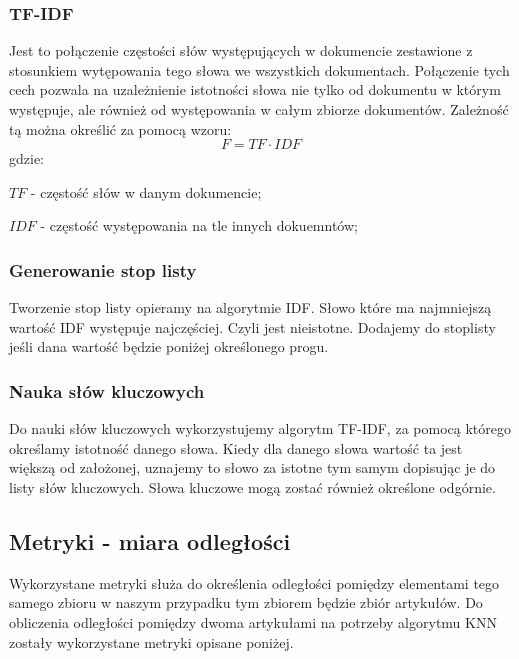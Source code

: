 \documentclass{classrep}
\begin{document}
\subsubsection{TF-IDF}
Jest to połączenie częstości słów występujących w dokumencie zestawione z stosunkiem wytępowania tego słowa we wszystkich
dokumentach. Połączenie tych cech pozwala na uzależnienie istotności słowa nie tylko od dokumentu w którym występuje,
ale również od występowania w całym zbiorze dokumentów. Zależność tą można określić za pomocą wzoru:
\begin{equation}
    F={TF}\cdot{IDF}
\end{equation}
gdzie:\\
\begin{description}
    \item $TF$ - częstość słów w danym dokumencie;
    \item $IDF$ - częstość występowania na tle innych dokuemntów;
\end{description}

\subsubsection{Generowanie stop listy}
Tworzenie stop listy opieramy na algorytmie IDF. Słowo które ma najmniejszą wartość IDF występuje najczęściej. Czyli jest
nieistotne. Dodajemy do stoplisty jeśli dana wartość będzie poniżej określonego progu.

\subsubsection{Nauka słów kluczowych}
Do nauki słów kluczowych wykorzystujemy algorytm TF-IDF, za pomocą którego określamy istotność
danego słowa. Kiedy dla danego słowa wartość ta jest większą od założonej, uznajemy to słowo za istotne tym samym dopisując je do
listy słów kluczowych. Słowa kluczowe mogą zostać również określone odgórnie.

\subsection{Metryki - miara odległości}
Wykorzystane metryki służa do określenia odległości pomiędzy elementami tego samego zbioru w naszym przypadku tym
zbiorem będzie zbiór artykułów. Do obliczenia odległości pomiędzy dwoma artykułami na potrzeby algorytmu KNN zostały
wykorzystane metryki opisane poniżej.
\end{document}
